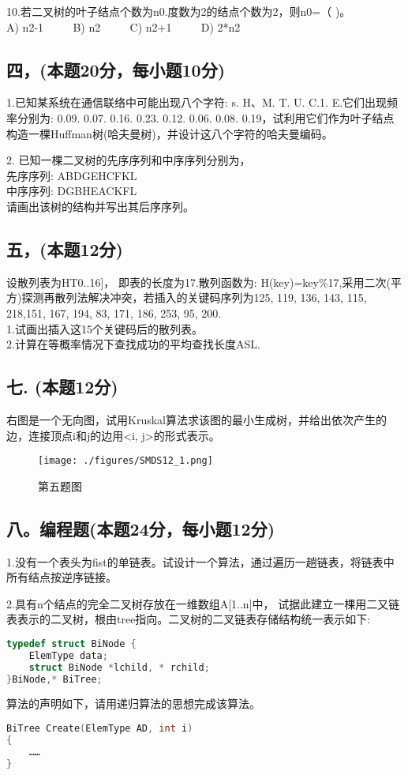 10.若二叉树的叶子结点个数为n0.度数为2的结点个数为2，则n0=（ )。 \\
A) n2-1 $\qquad$ B) n2 $\qquad$ C) n2+1 $\qquad$ D) 2*n2

\subsection{四，(本题20分，每小题10分)}

1.已知某系统在通信联络中可能出现八个字符: s. H、M. T. U. C.1. E.它们出现频率分别为: 0.09. 0.07. 0.16. 0.23. 0.12. 0.06. 0.08. 0.19，试利用它们作为叶子结点构造一棵Huffman树(哈夫曼树)，并设计这八个字符的哈夫曼编码。

2. 已知一棵二叉树的先序序列和中序序列分别为， \\
先序序列: ABDGEHCFKL \\
中序序列: DGBHEACKFL \\
请画出该树的结构并写出其后序序列。

\subsection{五，(本题12分)}
设散列表为HT0..16]， 即表的长度为17.散列函数为: H(key)=key\%17,采用二次(平方)探测再散列法解决冲突，若插入的关键码序列为{125, 119, 136, 143, 115, 218,151, 167, 194, 83, 171, 186, 253, 95, 200}. \\
1.试画出插入这15个关键码后的散列表。 \\
2.计算在等概率情况下查找成功的平均查找长度ASL.

\subsection{七. (本题12分)}
右图是一个无向图，试用Kruskal算法求该图的最小生成树，并给出依次产生的边，连接顶点i和j的边用<i, j>的形式表示。
\begin{figure}[ht]
\centering
\texttt{[image: ./figures/SMDS12\_1.png]}
\caption{第五题图} \label{SMDS12_fig1}
\end{figure}

\subsection{八。编程题(本题24分，每小题12分)}

1.没有一个表头为fist的单链表。试设计一个算法，通过遍历一趟链表，将链表中所有结点按逆序链接。

2.具有n个结点的完全二叉树存放在一维数组A[1..n]中， 试据此建立一棵用二又链表表示的二叉树，根由tree指向。二叉树的二叉链表存储结构统一表示如下:
\begin{lstlisting}[language=cpp]
typedef struct BiNode {
    ElemType data;
    struct BiNode *lchild, * rchild;
}BiNode,* BiTree;
\end{lstlisting}
算法的声明如下，请用递归算法的思想完成该算法。
\begin{lstlisting}[language=cpp]
BiTree Create(ElemType AD, int i)
{
    ……
}
\end{lstlisting}
